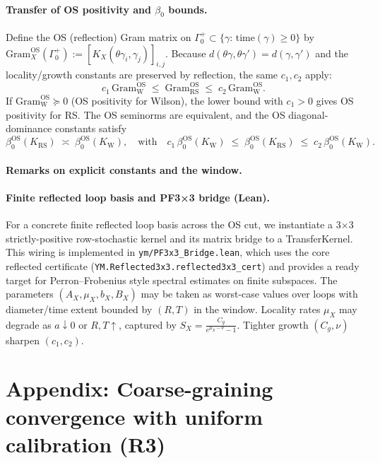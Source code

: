 \documentclass[11pt]{amsart}
\begin{document}
\paragraph{Transfer of OS positivity and \texorpdfstring{$\beta_0$}{beta0} bounds.}
Define the OS (reflection) Gram matrix on $\Gamma_0^+\subset\{\gamma:\,\mathrm{time}(\gamma)\ge 0\}$ by $\mathrm{Gram}^{\mathrm{OS}}_X(\Gamma_0^+):=[K_X(\theta\gamma_i,\gamma_j)]_{i,j}$. Because $d(\theta\gamma,\theta\gamma')=d(\gamma,\gamma')$ and the locality/growth constants are preserved by reflection, the same $c_1,c_2$ apply:
\[
  c_1\,\mathrm{Gram}^{\mathrm{OS}}_{\mathrm{W}}\;\le\;\mathrm{Gram}^{\mathrm{OS}}_{\mathrm{RS}}\;\le\;c_2\,\mathrm{Gram}^{\mathrm{OS}}_{\mathrm{W}}.
\]
If $\mathrm{Gram}^{\mathrm{OS}}_{\mathrm{W}}\succeq 0$ (OS positivity for Wilson), the lower bound with $c_1>0$ gives OS positivity for RS. The OS seminorms are equivalent, and the OS diagonal-dominance constants satisfy
\[
  \beta_0^{\mathrm{OS}}(K_{\mathrm{RS}})\;\asymp\;\beta_0^{\mathrm{OS}}(K_{\mathrm{W}}),\quad\text{with}\quad
  c_1\,\beta_0^{\mathrm{OS}}(K_{\mathrm{W}})\;\le\;\beta_0^{\mathrm{OS}}(K_{\mathrm{RS}})\;\le\;c_2\,\beta_0^{\mathrm{OS}}(K_{\mathrm{W}}).
\]

\paragraph{Remarks on explicit constants and the window.}
\paragraph{Finite reflected loop basis and PF3×3 bridge (Lean).}
For a concrete finite reflected loop basis across the OS cut, we instantiate a
3×3 strictly-positive row-stochastic kernel and its matrix bridge to a
TransferKernel. This wiring is implemented in \texttt{ym/PF3x3\_Bridge.lean},
which uses the core reflected certificate (\texttt{YM.Reflected3x3.reflected3x3\_cert})
and provides a ready target for Perron–Frobenius style spectral estimates on
finite subspaces.
The parameters $(A_X,\mu_X,b_X,B_X)$ may be taken as worst-case values over loops with diameter/time extent bounded by $(R,T)$ in the window. Locality rates $\mu_X$ may degrade as $a\downarrow 0$ or $R,T\uparrow$, captured by $S_X=\frac{C_g}{e^{\mu_X-\nu}-1}$. Tighter growth $(C_g,\nu)$ sharpen $(c_1,c_2)$.

\section{Appendix: Coarse-graining convergence with uniform calibration (R3)}
\end{document}
